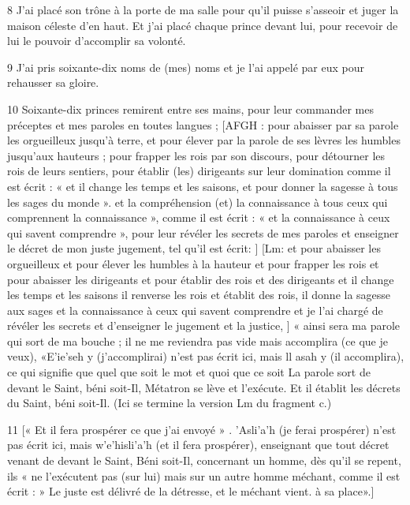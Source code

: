\par 8 J'ai placé son trône à la porte de ma salle pour qu'il puisse s'asseoir et juger la maison céleste d'en haut. Et j'ai placé chaque prince devant lui, pour recevoir de lui le pouvoir d'accomplir sa volonté.

\par 9 J'ai pris soixante-dix noms de (mes) noms et je l'ai appelé par eux pour rehausser sa gloire.

\par 10 Soixante-dix princes remirent entre ses mains, pour leur commander mes préceptes et mes paroles en toutes langues ; [AFGH : pour abaisser par sa parole les orgueilleux jusqu'à terre, et pour élever par la parole de ses lèvres les humbles jusqu'aux hauteurs ; pour frapper les rois par son discours, pour détourner les rois de leurs sentiers, pour établir (les) dirigeants sur leur domination comme il est écrit : « et il change les temps et les saisons, et pour donner la sagesse à tous les sages du monde ». et la compréhension (et) la connaissance à tous ceux qui comprennent la connaissance », comme il est écrit : « et la connaissance à ceux qui savent comprendre », pour leur révéler les secrets de mes paroles et enseigner le décret de mon juste jugement, tel qu'il est écrit: ] [Lm: et pour abaisser les orgueilleux et pour élever les humbles à la hauteur et pour frapper les rois et pour abaisser les dirigeants et pour établir des rois et des dirigeants et il change les temps et les saisons il renverse les rois et établit des rois, il donne la sagesse aux sages et la connaissance à ceux qui savent comprendre et je l'ai chargé de révéler les secrets et d'enseigner le jugement et la justice, ] « ainsi sera ma parole qui sort de ma bouche ; il ne me reviendra pas vide mais accomplira (ce que je veux), «E'ie'seh y (j'accomplirai) n'est pas écrit ici, mais ll asah y (il accomplira), ce qui signifie que quel que soit le mot et quoi que ce soit La parole sort de devant le Saint, béni soit-Il, Métatron se lève et l'exécute. Et il établit les décrets du Saint, béni soit-Il. (Ici se termine la version Lm du fragment c.)

\par 11 [« Et il fera prospérer ce que j'ai envoyé » . 'Asli'a'h (je ferai prospérer) n'est pas écrit ici, mais w'e'hisli'a'h (et il fera prospérer), enseignant que tout décret venant de devant le Saint, Béni soit-Il, concernant un homme, dès qu'il se repent, ils « ne l'exécutent pas (sur lui) mais sur un autre homme méchant, comme il est écrit : » Le juste est délivré de la détresse, et le méchant vient. à sa place».]

